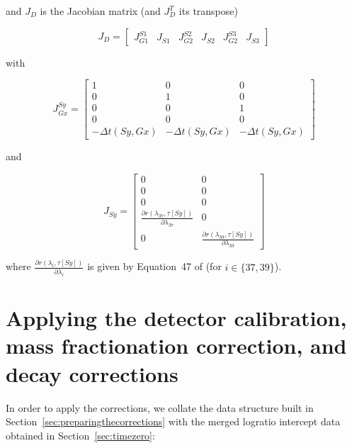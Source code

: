 \documentclass{article}
\begin{document}
\noindent and $J_D$ is the Jacobian matrix (and $J_D^T$ its transpose)

\begin{equation}
  J_D =
  \left[
    \begin{array}{cc|cc|cc}
      J_{G1}^{S1} & J_{S1} & J_{G2}^{S2} & J_{S2} & J_{G2}^{S3} & J_{S3}
    \end{array}
    \right]
\end{equation}

\noindent with

\begin{equation}
  J_{Gx}^{Sy} = \left[
    \begin{array}{ccc}
      1 & 0 & 0 \\
      0 & 1 & 0 \\
      0 & 0 & 1 \\
      0 & 0 & 0 \\
      -\Delta t(Sy,Gx) & -\Delta t(Sy,Gx) & -\Delta t(Sy,Gx)
    \end{array}
    \right]
\end{equation}

\noindent and

\begin{equation}
  J_{Sy} = \left[
    \begin{array}{cc}
      0 & 0 \\
      0 & 0 \\
      0 & 0 \\
      \frac{\partial{r(\lambda_{37},\tau[Sy])}}{\partial{\lambda_{37}}} & 0\\
      0 & \frac{\partial{r(\lambda_{39},\tau[Sy])}}{\partial{\lambda_{39}}}
    \end{array}
    \right]  
\end{equation}

\noindent where
$\frac{\partial{r(\lambda_{i},\tau[Sy])}}{\partial{\lambda_{i}}}$ is given by
Equation~47 of \citet{vermeesch2015b} (for $i \in \{37, 39\}$).

\section{Applying the detector calibration,
  mass fractionation correction, and decay corrections}
\label{sec:applyingthecorrections}

In order to apply the corrections, we collate the data structure built
in Section~\ref{sec:preparingthecorrections} with the merged logratio
intercept data obtained in Section~\ref{sec:timezero}:
\end{document}
